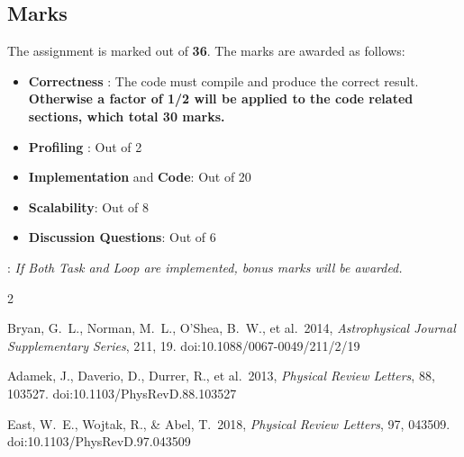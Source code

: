 \documentclass[11pt]{amsart}
\begin{document}
\subsection*{Marks\nopunct\\}\label{sec:handin:marks}
\noindent The assignment is marked out of \textbf{36}. The marks are awarded as follows:
\begin{itemize}
  \item{\textbf{Correctness} : The code must compile and produce the correct result. \textbf{Otherwise a factor of 1/2 will be applied to the code related sections, which total 30 marks.}}
  \item{\textbf{Profiling} : Out of 2}
  \item{\textbf{Implementation} and \textbf{Code}: Out of 20}
  \item{\textbf{Scalability}: Out of 8}
  \item{\textbf{Discussion Questions}: Out of 6}
\end{itemize}

: \textit{If Both Task and Loop are implemented, bonus marks will be awarded.}



\begin{thebibliography}{2}

 Bryan, G.~L., Norman, M.~L., O'Shea, B.~W., et al.\ 2014, \textit{Astrophysical Journal Supplementary Series}, 211, 19. doi:10.1088/0067-0049/211/2/19

 Adamek, J., Daverio, D., Durrer, R., et al.\ 2013, \textit{Physical Review Letters}, 88, 103527. doi:10.1103/PhysRevD.88.103527

 East, W.~E., Wojtak, R., \& Abel, T.\ 2018, \textit{Physical Review Letters}, 97, 043509. doi:10.1103/PhysRevD.97.043509

\end{thebibliography}
\end{document}
